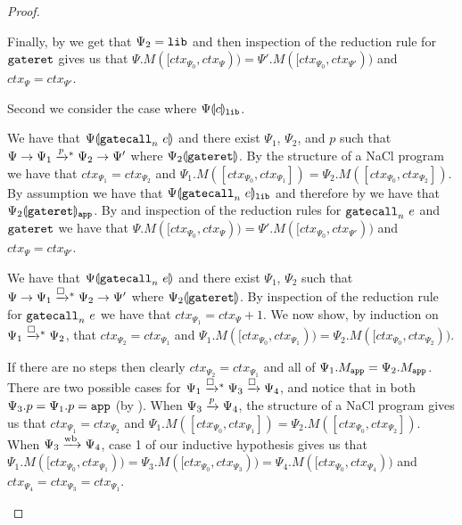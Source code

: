 \begin{proof}
\begin{itemize}
    Finally, by  we get that $\Psi_2 = \mathtt{lib}$ and then inspection of the reduction rule for $\mathtt{gateret}$ gives us that $\Psi.M([ctx_{\Psi_0}, ctx_{\Psi})) = \Psi'.M([ctx_{\Psi_0}, ctx_{\Psi'}))$ and $ctx_{\Psi} = ctx_{\Psi'}$.
  \end{itemize}

  Second we consider the case where ${\Psi}\llparenthesis{c}\rrparenthesis_{\mathtt{lib}}$.
  \begin{itemize}

    We have that ${\Psi}\llparenthesis{\ensuremath{\mathtt{gatecall}_{n}\ {e}}}\rrparenthesis$ and there exist $\Psi_1$, $\Psi_2$, and $p$ such that $\Psi \step \Psi_1 \steppstar{p} \Psi_2 \step \Psi'$ where ${\Psi_2}\llparenthesis{\ensuremath{\mathtt{gateret}}}\rrparenthesis$.
    By the structure of a NaCl program we have that $ctx_{\Psi_1} = ctx_{\Psi_2}$ and $\Psi_1.M([ctx_{\Psi_0}, ctx_{\Psi_1}]) = \Psi_2.M([ctx_{\Psi_0}, ctx_{\Psi_2}])$.
    By assumption we have that ${\Psi}\llparenthesis{\ensuremath{\mathtt{gatecall}_{n}\ {e}}}\rrparenthesis_{\mathtt{lib}}$ and therefore by  we have that ${\Psi_2}\llparenthesis{\ensuremath{\mathtt{gateret}}}\rrparenthesis_{\mathtt{app}}$.
    By  and inspection of the reduction rules for $\mathtt{gatecall}_{n}\ {e}$ and $\mathtt{gateret}$ we have that $\Psi.M([ctx_{\Psi_0}, ctx_{\Psi})) = \Psi'.M([ctx_{\Psi_0}, ctx_{\Psi'}))$ and $ctx_{\Psi} = ctx_{\Psi'}$.


    We have that ${\Psi}\llparenthesis{\ensuremath{\mathtt{gatecall}_{n}\ {e}}}\rrparenthesis$ and there exist $\Psi_1$, $\Psi_2$  such that $\Psi \step \Psi_1 \stepboxstar \Psi_2 \step \Psi'$ where ${\Psi_2}\llparenthesis{\ensuremath{\mathtt{gateret}}}\rrparenthesis$.
    By inspection of the reduction rule for $\mathtt{gatecall}_{n}\ {e}$ we have that $ctx_{\Psi_1} = ctx_{\Psi} + 1$.
    We now show, by induction on $\Psi_1 \stepboxstar \Psi_2$, that $ctx_{\Psi_2} = ctx_{\Psi_1}$ and $\Psi_1.M([ctx_{\Psi_0}, ctx_{\Psi_1})) = \Psi_2.M([ctx_{\Psi_0}, ctx_{\Psi_2}))$.

    \begin{subproof}
      If there are no steps then clearly $ctx_{\Psi_2} = ctx_{\Psi_1}$ and all of $\Psi_1.M_{\mathtt{app}} = \Psi_2.M_{\mathtt{app}}$.
      There are two possible cases for $\Psi_1 \stepboxstar \Psi_3 \stepbox \Psi_4$, and notice that in both $\Psi_3.p = \Psi_1.p = \mathtt{app}$ (by ).
      When $\Psi_3 \mathrel{\xrightarrow{p}} \Psi_4$, the structure of a NaCl program gives us that $ctx_{\Psi_1} = ctx_{\Psi_2}$ and $\Psi_1.M([ctx_{\Psi_0}, ctx_{\Psi_1}]) = \Psi_2.M([ctx_{\Psi_0}, ctx_{\Psi_2}])$.
      When $\Psi_3 \mathrel{\xrightarrow{\!\text{wb}}} \Psi_4$, case 1 of our inductive hypothesis gives us that $\Psi_1.M([ctx_{\Psi_0}, ctx_{\Psi_1})) = \Psi_3.M([ctx_{\Psi_0}, ctx_{\Psi_3})) = \Psi_4.M([ctx_{\Psi_0}, ctx_{\Psi_4}))$ and $ctx_{\Psi_4} = ctx_{\Psi_3} = ctx_{\Psi_1}$.
    \end{subproof}


\end{itemize}
\end{proof}
